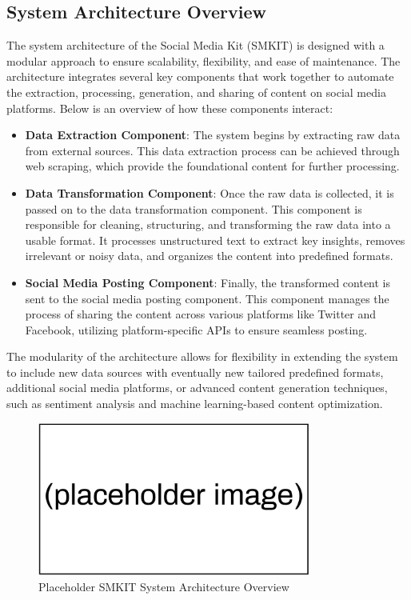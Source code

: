 \begin{itemize}
\end{itemize}

\subsection{System Architecture Overview}
\label{subsec:system_architecture_overview}
The system architecture of the Social Media Kit (SMKIT) is designed with a modular approach to ensure scalability, flexibility, and ease of maintenance. The architecture integrates several key components that work together to automate the extraction, processing, generation, and sharing of content on social media platforms. Below is an overview of how these components interact:

\begin{itemize}
    \item \textbf{Data Extraction Component}: The system begins by extracting raw data from external sources. This data extraction process can be achieved through web scraping, which provide the foundational content for further processing.

    \item \textbf{Data Transformation Component}: Once the raw data is collected, it is passed on to the data transformation component. This component is responsible for cleaning, structuring, and transforming the raw data into a usable format. It processes unstructured text to extract key insights, removes irrelevant or noisy data, and organizes the content into predefined formats.
    
    \item \textbf{Social Media Posting Component}: Finally, the transformed content is sent to the social media posting component. This component manages the process of sharing the content across various platforms like Twitter and Facebook, utilizing platform-specific APIs to ensure seamless posting.
\end{itemize}

The modularity of the architecture allows for flexibility in extending the system to include new data sources with eventually new tailored predefined formats, additional social media platforms, or advanced content generation techniques, such as sentiment analysis and machine learning-based content optimization.

\begin{figure}[ht]
    \centering
    \includegraphics[width=0.8\textwidth]{figures/methodology/placeholder_image.png}
    \caption{Placeholder SMKIT System Architecture Overview}
    \label{fig:methodology_smkit_system_architecture_overview}
\end{figure}

